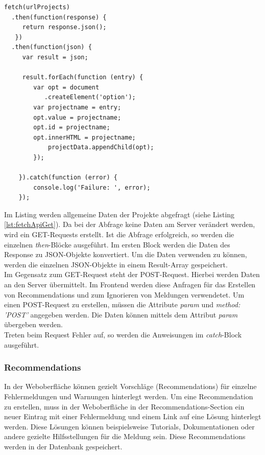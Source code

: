 \begin{samepage}%
	\begin{lstlisting}[float=tbhp]
fetch(urlProjects)
  .then(function(response) {
     return response.json();
   })
  .then(function(json) {
     var result = json;
        
  	 result.forEach(function (entry) {
        var opt = document
           .createElement('option');
        var projectname = entry;
        opt.value = projectname;
        opt.id = projectname;
        opt.innerHTML = projectname;
            projectData.appendChild(opt);
        });
        
    }).catch(function (error) {
        console.log('Failure: ', error);
    });

	\end{lstlisting}
\end{samepage}

Im Listing werden allgemeine Daten der Projekte abgefragt (siehe Listing \ref{lst:fetchApiGet}). Da bei der Abfrage keine Daten am Server verändert werden, wird ein GET-Requests erstellt. Ist die Abfrage erfolgreich, so werden die einzelnen \textit{then}-Blöcke ausgeführt. Im ersten Block werden die Daten des Response zu JSON-Objekte konvertiert. Um die Daten verwenden zu können, werden die einzelnen JSON-Objekte in einem Result-Array gespeichert.  \\
Im Gegensatz zum GET-Request steht der POST-Request. Hierbei werden Daten an den Server übermittelt. Im Frontend werden diese Anfragen für das Erstellen von Recommendations und zum Ignorieren von Meldungen verwendetet. Um einen POST-Request zu erstellen, müssen die Attribute \textit{param} und \textit{method: 'POST'} angegeben werden. Die Daten können mittels dem Attribut \textit{param} übergeben werden. \\
Treten beim Request Fehler auf, so werden die Anweisungen im \textit{catch}-Block ausgeführt.

\subsubsection{Recommendations}
In der Weboberfläche können gezielt Vorschläge (Recommendations) für einzelne Fehlermeldungen und Warnungen hinterlegt werden. Um eine Recommendation zu erstellen, muss in der Weboberfläche in der Recommendations-Section ein neuer Eintrag mit einer Fehlermeldung und einem Link auf eine Lösung hinterlegt werden. Diese Lösungen können beispielsweise Tutorials, Dokumentationen oder andere gezielte Hilfsstellungen für die Meldung sein. Diese Recommendations werden in der Datenbank gespeichert.

